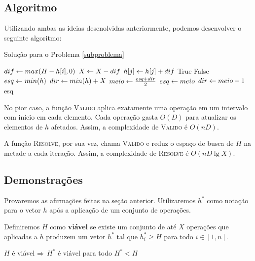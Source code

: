 \subsection{Algoritmo}

Utilizando ambas as ideias desenolvidas anteriormente, podemos desenvolver o seguinte algoritmo:

\begin{algorithm}[H]
\caption{Solução para o Problema \ref{subproblema}}
\label{subproblema:code}
\begin{algorithmic}[1]
        \State $dif \leftarrow max(H - h[i], 0)$
        \State $X \leftarrow X - dif$
            \State $h[j] \leftarrow h[j] + dif$
        \EndFor
    \EndFor
        \State \Return True
    \Else
        \State \Return False
    \EndIf
\EndFunction
{}
    \State $esq \leftarrow min(h)$
    \State $dir \leftarrow min(h) + X$
        \State $meio \leftarrow \frac{esq + dir}{2}$
            \State $esq \leftarrow meio$
        \Else
            \State $dir \leftarrow meio - 1$
        \EndIf
    \EndWhile
    \State \Return esq
\EndFunction
\end{algorithmic}
\end{algorithm}

No pior caso, a função \textsc{Valido} aplica exatamente uma operação em um intervalo com início em cada elemento. Cada operação gasta $O(D)$ para atualizar os elementos de $h$ afetados. Assim, a complexidade de \textsc{Valido} é $O(nD)$.

A função \textsc{Resolve}, por sua vez, chama \textsc{Valido} e reduz o espaço de busca de $H$ na metade a cada iteração. Assim, a complexidade de \textsc{Resolve} é $O(nD \lg X)$.

\subsection{Demonstrações}

Provaremos as afirmações feitas na seção anterior. Utilizaremos $h^*$ como notação para o vetor $h$ após a aplicação de um conjunto de operações.

Definiremos $H$ como \textbf{viável} se existe um conjunto de até $X$ operações que aplicadas a $h$ produzem um vetor $h^*$ tal que $h^*_i \geq H$ para todo $i \in [1, n]$.

\begin{prop}
    $H$ é viável $\Rightarrow$ $H^*$ é viável para todo $H^* < H$
\end{prop}

